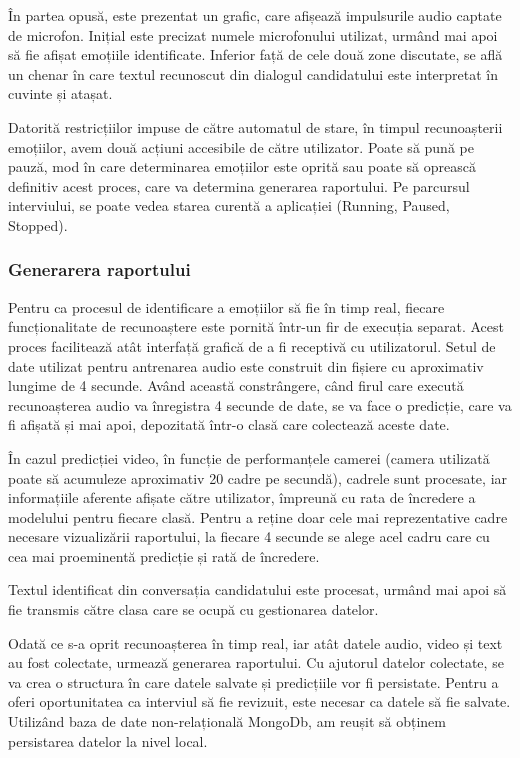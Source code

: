 \documentclass[a4paper, 12pt]{report}
\begin{document}
	În partea opusă, este prezentat un grafic, care afișează impulsurile audio captate de microfon. Inițial este precizat numele microfonului utilizat, urmând mai apoi să fie afișat emoțiile identificate. Inferior față de cele două zone discutate, se află un chenar în care textul recunoscut din dialogul candidatului este interpretat în cuvinte și atașat.

	Datorită restricțiilor impuse de către automatul de stare, în timpul recunoașterii emoțiilor, avem două acțiuni accesibile de către utilizator. Poate să pună pe pauză, mod în care determinarea emoțiilor este oprită sau poate să oprească definitiv acest proces, care va determina generarea raportului. Pe parcursul interviului, se poate vedea starea curentă a aplicației (Running, Paused, Stopped).

	\subsubsection{Generarera raportului}
	Pentru ca procesul de identificare a emoțiilor să fie în timp real, fiecare funcționalitate de recunoaștere este pornită într-un fir de execuția separat. Acest proces facilitează atât interfață grafică de a fi receptivă cu utilizatorul. Setul de date utilizat pentru antrenarea audio este construit din fișiere cu aproximativ lungime de 4 secunde. Având această constrângere, când firul care execută recunoașterea audio va înregistra 4 secunde de date, se va face o predicție, care va fi afișată și mai apoi, depozitată într-o clasă care colectează aceste date. 

	În cazul predicției video, în funcție de performanțele camerei (camera utilizată poate să acumuleze aproximativ 20 cadre pe secundă), cadrele sunt procesate, iar informațiile aferente afișate către utilizator, împreună cu rata de încredere a modelului pentru fiecare clasă. Pentru a reține doar cele mai reprezentative cadre necesare vizualizării raportului, la fiecare 4 secunde se alege acel cadru care cu cea mai proeminentă predicție și rată de încredere.

	Textul identificat din conversația candidatului este procesat, urmând mai apoi să fie transmis către clasa care se ocupă cu gestionarea datelor. 	

	Odată ce s-a oprit recunoașterea în timp real, iar atât datele audio, video și text au fost colectate, urmează generarea raportului. Cu ajutorul datelor colectate, se va crea o structura în care datele salvate și predicțiile vor fi persistate. Pentru a oferi oportunitatea ca interviul să fie revizuit, este necesar ca datele să fie salvate. Utilizând baza de date non-relațională MongoDb, am reușit să obținem persistarea datelor la nivel local.
\end{document}
